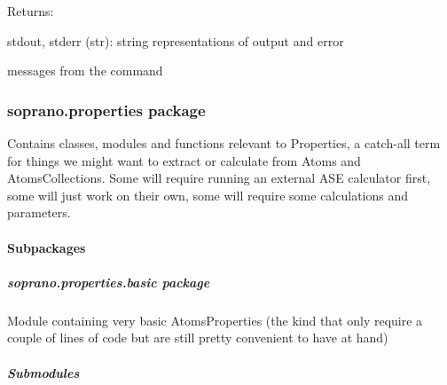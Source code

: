 \documentclass[letterpaper,10pt,english]{sphinxmanual}
\begin{document}
\begin{fulllineitems}
\begin{fulllineitems}
\begin{DUlineblock}{0em}
\item[] Returns:
\item[]
\begin{DUlineblock}{\DUlineblockindent}
\item[] stdout, stderr (str): string representations of output and error
\item[]
\begin{DUlineblock}{\DUlineblockindent}
\item[] messages from the command
\end{DUlineblock}
\end{DUlineblock}
\end{DUlineblock}

\end{fulllineitems}


\end{fulllineitems}



\subsubsection{soprano.properties package}
\label{doctree/soprano.properties:module-soprano.properties}\label{doctree/soprano.properties:soprano-properties-package}\label{doctree/soprano.properties::doc}
Contains classes, modules and functions relevant to Properties,
a catch-all term for things we might want to extract or calculate from
Atoms and AtomsCollections. Some will require running an external ASE
calculator first, some will just work on their own, some will require
some calculations and parameters.


\paragraph{Subpackages}
\label{doctree/soprano.properties:subpackages}

\subparagraph{soprano.properties.basic package}
\label{doctree/soprano.properties.basic:soprano-properties-basic-package}\label{doctree/soprano.properties.basic::doc}\label{doctree/soprano.properties.basic:module-soprano.properties.basic}
Module containing very basic AtomsProperties (the kind that only require
a couple of lines of code but are still pretty convenient to have at hand)


\subparagraph{Submodules}
\label{doctree/soprano.properties.basic:submodules}
\end{document}
